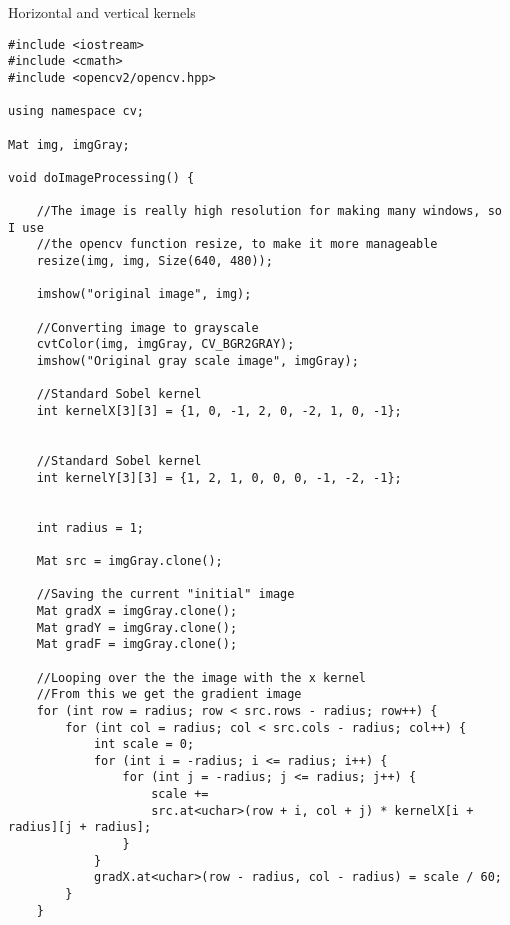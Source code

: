 \begin{listing}[H]
    	\caption{Horizontal and vertical kernels}
    	\label{listing:code1}
    	\begin{verbatim}
#include <iostream>
#include <cmath>
#include <opencv2/opencv.hpp>

using namespace cv;

Mat img, imgGray;

void doImageProcessing() {
	
	//The image is really high resolution for making many windows, so I use 
	//the opencv function resize, to make it more manageable
	resize(img, img, Size(640, 480));
	
	imshow("original image", img);
	
	//Converting image to grayscale
	cvtColor(img, imgGray, CV_BGR2GRAY);
	imshow("Original gray scale image", imgGray);
	
	//Standard Sobel kernel
	int kernelX[3][3] = {1, 0, -1, 2, 0, -2, 1, 0, -1};
	
	
	//Standard Sobel kernel
	int kernelY[3][3] = {1, 2, 1, 0, 0, 0, -1, -2, -1};
	
	
	int radius = 1;
	
	Mat src = imgGray.clone();
	
	//Saving the current "initial" image
	Mat gradX = imgGray.clone();
	Mat gradY = imgGray.clone();
	Mat gradF = imgGray.clone();
	
	//Looping over the the image with the x kernel
	//From this we get the gradient image
	for (int row = radius; row < src.rows - radius; row++) {
		for (int col = radius; col < src.cols - radius; col++) {
			int scale = 0;
			for (int i = -radius; i <= radius; i++) {
				for (int j = -radius; j <= radius; j++) {
					scale += 
					src.at<uchar>(row + i, col + j) * kernelX[i + radius][j + radius];
				}
			}
			gradX.at<uchar>(row - radius, col - radius) = scale / 60;
		}
	}
    	\end{verbatim}
    \end{listing}


